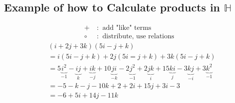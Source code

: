 \subsection*{Example of how to Calculate products in $\mathbb{H}$}
\begin{align}
    + \ &: \ \text{ add "like" terms}\nonumber \\
    \circ \ &: \ \text{ distribute, use relations}\nonumber
\end{align}
\begin{align}
    & (i+2j+3k)(5i-j+k) \nonumber \\
    &=i(5i-j+k)+2j(5i=j+k)+3k(5i-j+k) \nonumber \\
    &= 5\underbrace{i^2}_{-1}-\underbrace{ij}_{k}+\underbrace{ik}_{-j}+10\underbrace{ji}_{-k}-2\underbrace{j^2}_{-1}+2\underbrace{jk}_{i}+15\underbrace{ki}_{j}-3\underbrace{kj}_{-i}+3\underbrace{k^2}_{-1} \nonumber \\
    &= -5-k-j-10k+2+2i+15j+3i-3 \nonumber \\
    &= -6+5i+14j-11k \nonumber
\end{align}

